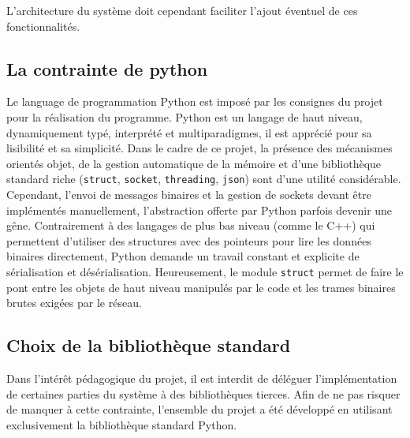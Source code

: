 L'architecture du système doit cependant faciliter l'ajout éventuel de ces fonctionnalités.

\subsection{La contrainte de python}
Le language de programmation Python est imposé par les consignes du projet pour la réalisation du programme.
Python est un langage de haut niveau, dynamiquement typé, interprété et multiparadigmes, il est apprécié pour sa lisibilité et sa simplicité.
Dans le cadre de ce projet, la présence des mécanismes orientés objet, de la gestion automatique de la mémoire et d'une bibliothèque standard riche (\texttt{struct}, \texttt{socket}, \texttt{threading}, \texttt{json}) sont d'une utilité considérable.
Cependant, l'envoi de messages binaires et la gestion de sockets devant être implémentés manuellement, l'abstraction offerte par Python parfois devenir une gêne.
Contrairement à des langages de plus bas niveau (comme le C++) qui permettent d'utiliser des structures avec des pointeurs pour lire les données binaires directement, Python demande un travail constant et explicite de sérialisation et désérialisation.
Heureusement, le module \texttt{struct} permet de faire le pont entre les objets de haut niveau manipulés par le code et les trames binaires brutes exigées par le réseau.

\subsection{Choix de la bibliothèque standard}
Dans l'intérêt pédagogique du projet, il est interdit de déléguer l'implémentation de certaines parties du système à des bibliothèques tierces.
Afin de ne pas risquer de manquer à cette contrainte, l'ensemble du projet a été développé en utilisant exclusivement la bibliothèque standard Python.

